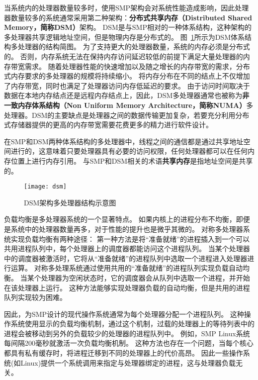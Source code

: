 	当系统内的处理器数量较多时，使用SMP架构会对系统性能造成影响，因此处理器数量较多的系统通常采用第二种架构：\textbf{分布式共享内存（Distributed Shared Memory，简称DSM）}架构。
	DSM是与SMP相对的一种体系结构，这种架构的多处理器共享逻辑地址空间，但是物理内存是分布式的。
	图~\ref{fig:dsm}所示为DSM体系结构多处理器的结构简图。
	为了支持更大的处理器数量，系统的内存必须是分布式的。
	否则，内存系统无法在保持内存访问延迟较低的前提下满足大量处理器的内存带宽需求。
	随着处理器性能的快速增加以及随之增长的内存带宽的需求，分布式内存要求的多处理器的规模将持续缩小。
	将内存分布在不同的结点上不仅增加了内存带宽，同时也满足了处理器访问内存低延迟的要求。
	由于访问时间取决于数据在本地内存结点还是远程内存结点上，因此，DSM多处理器通常也被称为\textbf{非一致内存体系结构（Non Uniform Memory Architecture，简称NUMA）}多处理器。DSM的主要缺点是处理器之间的数据传输更加复杂，若要充分利用分布式存储器提供的更高的内存带宽需要花费更多的精力进行软件设计。

在SMP和DSM两种体系结构的多处理器中，线程之间的通信都是通过共享地址空间进行的，这意味着只要处理器具有必要的访问权限，任何处理器都可以在任何内存位置上进行内存引用。
与SMP和DSM相关的术语\textbf{共享内存}是指地址空间是共享的。

\begin{figure}
\centering
\texttt{[image: dsm]}
\caption{DSM架构多处理器结构示意图}
\label{fig:dsm}
\end{figure}


负载均衡是多处理器系统的一个显著特点。
如果内核上的进程分布不均衡，即便是系统中的处理器数量再多，对于性能的提升也是微乎其微的。
对称多处理器系统实现负载均衡有两种途径：
第一种方法是将“准备就绪”的进程插入到一个可以共用进程队列中，每个处理器上的调度器都能访问这个进程队列。
当某个处理器中的调度器被激活时，它将从“准备就绪”的进程队列中选取一个进程进入处理器进行运算。
对称多处理系统通过使用共用的“准备就绪”的进程队列实现负载自动均衡。
当某个处理器为空闲状态时，它的调度器会从队列中选取一个进程，并开始在该处理器上运行。
这种方法能够实现处理器负载的自动均衡，但是共用的进程队列实现较为困难。

因此，为SMP设计的现代操作系统通常为每个处理器分配一个进程队列。
这种操作系统使用显示的负载均衡机制，通过这个机制，过载的处理器上的等待列表中的进程会被移动到另外的负载较少的处理器的进程队列中。
例如，SMP Linux系统每间隔200毫秒就激活一次负载均衡机制\cite{bolla2008effective}。
这种方法也存在一个问题，当每个核心都具有私有缓存时，将进程迁移到不同的处理器上的代价高昂。
因此一些操作系统(如Linux)提供一个系统调用来指定与处理器绑定的进程，这与处理器负载无关。

